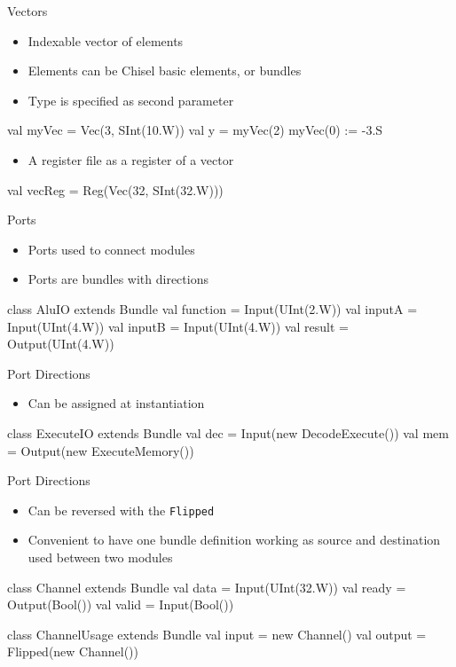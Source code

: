 \documentclass[xcolor=pdflatex,dvipsnames,table]{beamer}
\newcommand{\code}[1]{{\texttt{#1}}}
\begin{document}
\begin{frame}[fragile]{Vectors}
\begin{itemize}
\item Indexable vector of elements
\item Elements can be Chisel basic elements, or bundles
\item Type is specified as second parameter
\end{itemize}
\begin{chisel}
val myVec = Vec(3, SInt(10.W))
val y = myVec(2)
myVec(0) := -3.S
\end{chisel}
\begin{itemize}
\item A register file as a register of a vector
\end{itemize}
\begin{chisel}
val vecReg = Reg(Vec(32, SInt(32.W)))
\end{chisel}
\end{frame}

\begin{frame}[fragile]{Ports}
\begin{itemize}
\item Ports used to connect modules
\item Ports are bundles with directions
\end{itemize}
\begin{chisel}
class AluIO extends Bundle {
  val function = Input(UInt(2.W))
  val inputA = Input(UInt(4.W))
  val inputB = Input(UInt(4.W))
  val result = Output(UInt(4.W))
}
\end{chisel}
\end{frame}

\begin{frame}[fragile]{Port Directions}
\begin{itemize}
\item Can be assigned at instantiation
\end{itemize}
\begin{chisel}
class ExecuteIO extends Bundle {
  val dec = Input(new DecodeExecute())
  val mem = Output(new ExecuteMemory())
}
\end{chisel}
\begin{chisel}
\end{chisel}
\end{frame}

\begin{frame}[fragile]{Port Directions}
\begin{itemize}
\item Can be reversed with the \code{Flipped}
\item Convenient to have one bundle definition working as source
and destination used between two modules
\end{itemize}
\begin{chisel}
class Channel extends Bundle {
  val data = Input(UInt(32.W))
  val ready = Output(Bool())
  val valid = Input(Bool())
}

class ChannelUsage extends Bundle {
  val input = new Channel()
  val output = Flipped(new Channel())
}
\end{chisel}
\end{frame}
\end{document}
